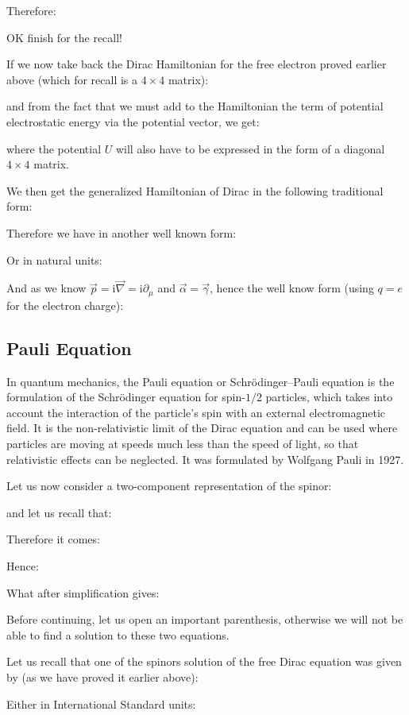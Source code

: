 	Therefore:
	
	OK finish for the recall!
	
	If we now take back the Dirac Hamiltonian for the free electron proved earlier above (which for recall is a $4\times 4$ matrix):
	
	and from the fact that we must add to the Hamiltonian the term of potential electrostatic energy via the potential vector, we get:
	
	where the potential $U$ will also have to be expressed in the form of a diagonal $4\times 4$ matrix.

	We then get the generalized Hamiltonian of Dirac in the following traditional form:
	
	Therefore we have in another well known form:
	
	Or in natural units:
	
	And as we know $\vec{p}=\mathrm{i}\vec{\nabla}=\mathrm{i}\partial_\mu$ and $\vec{\alpha}=\vec{\gamma}$, hence the well know form (using $q=e$ for the electron charge):
	
	
	\pagebreak
	\subsection{Pauli Equation}\label{pauli equation}
	In quantum mechanics, the Pauli equation or Schrödinger–Pauli equation is the formulation of the Schrödinger equation for spin-$1/2$ particles, which takes into account the interaction of the particle's spin with an external electromagnetic field. It is the non-relativistic limit of the Dirac equation and can be used where particles are moving at speeds much less than the speed of light, so that relativistic effects can be neglected. It was formulated by Wolfgang Pauli in 1927.
	
	Let us now consider a two-component representation of the spinor:
	
	and let us recall that:
	
	Therefore it comes:
	
	Hence:
	
	What after simplification gives:
	
	Before continuing, let us open an important parenthesis, otherwise we will not be able to find a solution to these two equations.

	Let us recall that one of the spinors solution of the free Dirac equation was given by (as we have proved it earlier above):
	
	Either in International Standard units:
	
